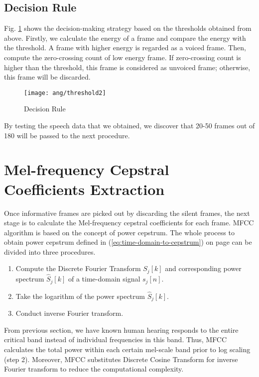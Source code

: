 
\subsection{Decision Rule}

Fig. \ref{threshold2} shows the decision-making strategy based on the thresholds obtained from above. Firstly, we calculate the energy of a frame and compare the energy with the threshold. A frame with higher energy is regarded as a voiced frame. Then, compute the zero-crossing count of low energy frame. If zero-crossing count is higher than the threshold, this frame is considered as unvoiced frame; otherwise, this frame will be discarded.

\begin{figure}[H]
\centering
\texttt{[image: ang/threshold2]}
\caption{Decision Rule}
\label{threshold2}
\end{figure}

By testing the speech data that we obtained, we discover that 20-50 frames out of 180 will be passed to the next procedure.


\section{Mel-frequency Cepstral Coefficients Extraction}
\label{subsection:mfcc}

Once informative frames are picked out by discarding the silent frames, the next stage is to calculate the Mel-frequency cepstral coefficients for each frame. MFCC algorithm is based on the concept of power cepstrum. The whole process to obtain power cepstrum defined in (\ref{eq:time-domain-to-cepstrum}) on page \pageref{eq:time-domain-to-cepstrum} can be divided into three procedures.
\begin{enumerate}
	\item Compute the Discrete Fourier Transform $S_j[k]$ and corresponding power spectrum $\hat{S}_j[k]$ of a time-domain signal $s_j[n]$.
	\item Take the logarithm of the power spectrum $\hat{S}_j[k]$.
	\item Conduct inverse Fourier transform.
\end{enumerate}

From previous section, we have known human hearing responds to the entire critical band instead of individual frequencies in this band. Thus, MFCC calculates the total power within each certain mel-scale band prior to log scaling (step 2). Moreover, MFCC substitutes Discrete Cosine Transform for inverse Fourier transform to reduce the computational complexity.

